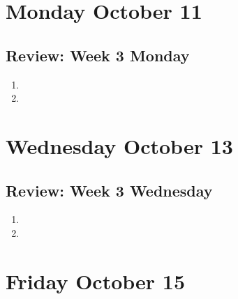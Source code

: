 \documentclass[12pt, oneside]{article}
\begin{document}
\section*{Monday October 11}



\newpage



\newpage
\subsection*{Review: Week 3 Monday}
\begin{enumerate}
    \item 
    \item 
\end{enumerate}
\newpage
\section*{Wednesday October 13}


\vfill

\vfill

\vfill



\vfill


\newpage

\newpage
\subsection*{Review: Week 3 Wednesday}
\begin{enumerate}
    \item 
    \item 
\end{enumerate}
\newpage
\section*{Friday October 15}

\newpage
\newpage

\newpage


\newpage
\end{document}
